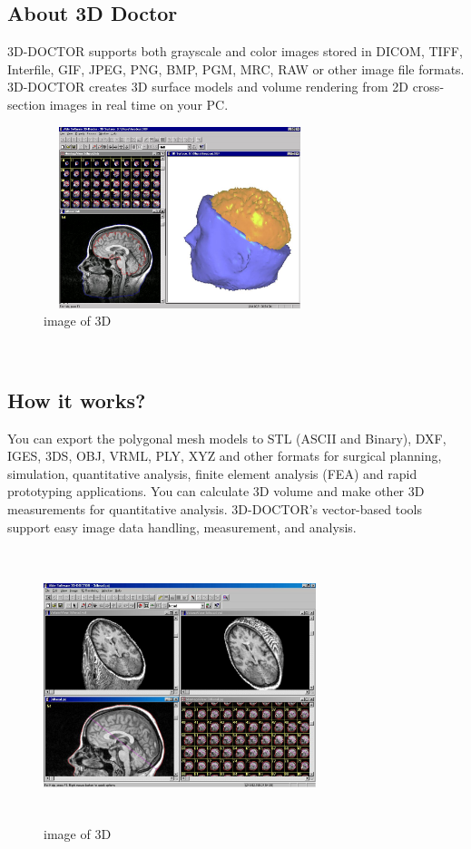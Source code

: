 \documentclass{article}
\begin{document}
\subsection{About 3D Doctor}
3D-DOCTOR supports both grayscale and color images stored in DICOM, TIFF, Interfile, GIF, JPEG, PNG, BMP, PGM, MRC, RAW or other image file formats. 3D-DOCTOR creates 3D surface models and volume rendering from 2D cross-section images in real time on your PC.
\\
\begin{figure}[h]
\includegraphics[width=300px,height=200px]{c.jpg}
\caption{image of 3D}
\label{shihab}
\end{figure}
\\
\newpage
\subsection{How it works?}
You can export the polygonal mesh models to STL (ASCII and Binary), DXF, IGES, 3DS, OBJ, VRML, PLY,  XYZ and other formats for surgical planning, simulation, quantitative analysis, finite element analysis (FEA) and rapid prototyping applications. You can calculate 3D volume and make other 3D measurements for quantitative analysis. 3D-DOCTOR's vector-based tools support easy image data handling, measurement, and analysis. 
\\
\begin{figure}[h]
\includegraphics[width=300px,height=300px]{d.jpg}
\caption{image of 3D}
\label{picture}
\end{figure}
\newpage
\end{document}
